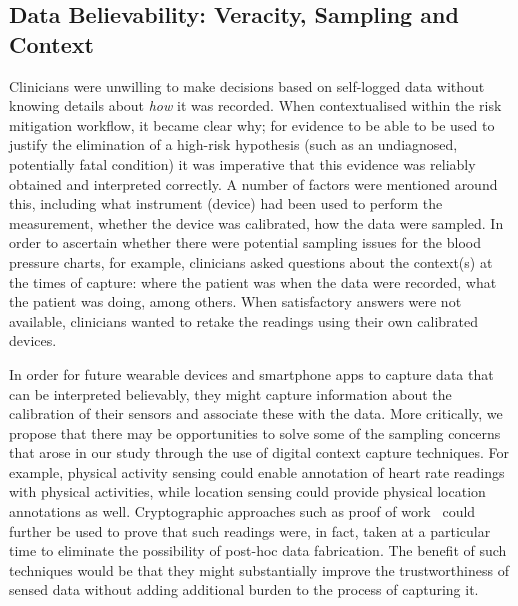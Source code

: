 \documentclass{sigchi}
\begin{document}


\subsection{Data Believability: Veracity, Sampling and Context}

Clinicians were unwilling to make decisions based on self-logged data without knowing details about \emph{how} it was recorded. When contextualised within the risk mitigation workflow, it became clear why; for evidence to be able to be used to justify the elimination of a high-risk hypothesis (such as an undiagnosed, potentially fatal condition) it was imperative that this evidence was reliably obtained and interpreted correctly.  A number of factors were mentioned around this, including what instrument (device) had been used to perform the measurement, whether the device was calibrated, how the data were sampled.  In order to ascertain whether there were potential sampling issues for the blood pressure charts, for example, clinicians asked questions about the context(s) at the times of capture: where the patient was when the data were recorded, what the patient was doing, among others.  When satisfactory answers were not available, clinicians wanted to retake the readings using their own calibrated devices.

In order for future wearable devices and smartphone apps to capture data that can be interpreted believably, they might capture information about the calibration of their sensors and associate these with the data.   More critically, we propose that there may be opportunities to solve some of the sampling concerns that arose in our study through the use of digital context capture techniques.  For example, physical activity sensing could enable annotation of heart rate readings with physical activities, while location sensing could provide physical location annotations as well.  Cryptographic approaches such as proof of work~\cite{clark2012commitcoin} could further be used to prove that such readings were, in fact, taken at a particular time to eliminate the possibility of post-hoc data fabrication.  The benefit of such techniques would be that they might substantially improve the trustworthiness of sensed data without adding additional burden to the process of capturing it.
\end{document}
